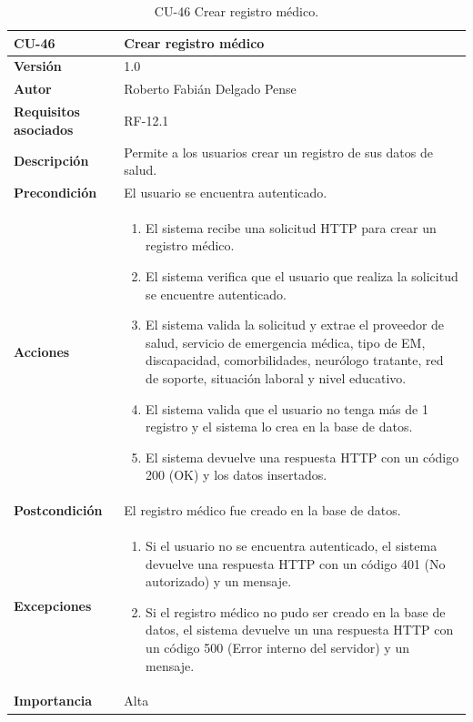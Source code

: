 \begin{table}[p]
	\centering
	\begin{tabularx}{\linewidth}{ p{} p{} }
		\toprule
		\textbf{CU-46}    & \textbf{Crear registro médico}\\
		\toprule
		\textbf{Versión}              & 1.0    \\
		\textbf{Autor}                & Roberto Fabián Delgado Pense \\
		\textbf{Requisitos asociados} & RF-12.1 \\ 
		\textbf{Descripción}          & Permite a los usuarios crear un registro de sus datos de salud. \\
		\textbf{Precondición}         & El usuario se encuentra autenticado. \\  
		\textbf{Acciones}             &
		\begin{enumerate}
			\def\labelenumi{\arabic{enumi}.}
			\tightlist
			\item El sistema recibe una solicitud HTTP para crear un registro médico.
                \item El sistema verifica que el usuario que realiza la solicitud se encuentre autenticado.
                \item El sistema valida la solicitud y extrae el proveedor de salud, servicio de emergencia médica, tipo de EM, discapacidad, comorbilidades, neurólogo tratante, red de soporte, situación laboral y nivel educativo.
                \item El sistema valida que el usuario no tenga más de 1 registro y el sistema lo crea en la base de datos.
                \item El sistema devuelve una respuesta HTTP con un código 200 (OK) y los datos insertados.         
            \end{enumerate}\\
		\textbf{Postcondición}        & El registro médico fue creado en la base de datos. \\
		\textbf{Excepciones}          & 
              \begin{enumerate}
			\def\labelenumi{\arabic{enumi}.}
			\tightlist
   			\item Si el usuario no se encuentra autenticado, el sistema devuelve una                 respuesta HTTP con un código 401 (No autorizado) y un mensaje.
                \item   Si el registro médico no pudo ser creado en la base de datos, el sistema devuelve un                           una respuesta HTTP con un código 500 (Error interno del servidor) y un mensaje. 
            \end{enumerate}\\
		\textbf{Importancia}          & Alta \\
		\bottomrule
	\end{tabularx}
	\caption{CU-46 Crear registro médico.}
\end{table}

